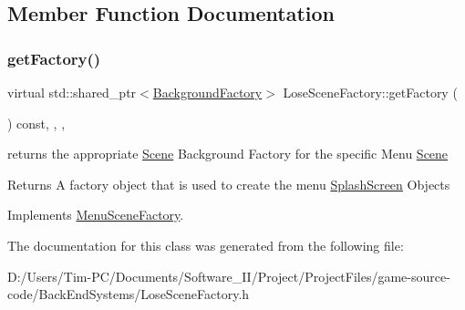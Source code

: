 \subsection{Member Function Documentation}
\mbox{\label{class_lose_scene_factory_adfe18ba674cdd988bb78e3cd3218796f}} 
\subsubsection{\texorpdfstring{get\+Factory()}{getFactory()}}
{\footnotesize\ttfamily virtual std\+::shared\+\_\+ptr$<$\hyperlink{class_background_factory}{Background\+Factory}$>$ Lose\+Scene\+Factory\+::get\+Factory (\begin{DoxyParamCaption}{ }\end{DoxyParamCaption}) const\hspace{0.3cm}{\ttfamily [inline]}, {\ttfamily [override]}, {\ttfamily [protected]}, {\ttfamily [virtual]}}



returns the appropriate \hyperlink{class_scene}{Scene} Background Factory for the specific Menu \hyperlink{class_scene}{Scene} 

\begin{DoxyReturn}{Returns}
A factory object that is used to create the menu \hyperlink{class_splash_screen}{Splash\+Screen} Objects 
\end{DoxyReturn}


Implements \hyperlink{class_menu_scene_factory_ad0f60a16fdbb10c6d7ba3311dafa2e76}{Menu\+Scene\+Factory}.



The documentation for this class was generated from the following file\+:\begin{DoxyCompactItemize}
\item 
D\+:/\+Users/\+Tim-\/\+P\+C/\+Documents/\+Software\+\_\+\+I\+I/\+Project/\+Project\+Files/game-\/source-\/code/\+Back\+End\+Systems/Lose\+Scene\+Factory.\+h\end{DoxyCompactItemize}
